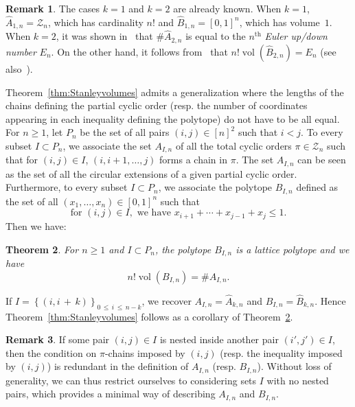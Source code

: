 \documentclass[11pt]{article}
\newtheorem{theo}{Theorem}[section]
\theoremstyle{definition}
\newtheorem{rema}[theo]{Remark}
\numberwithin{equation}{section}
\numberwithin{figure}{section}
\numberwithin{table}{section}
\DeclareMathOperator{\vol}{vol}
\newcommand{\calZ}{\mathcal Z}
\newcommand*{\MK}{\mkern 2mu}
\begin{document}
\begin{rema}\label{rem:k23}
The cases $k=1$ and $k=2$ are already known. When $k=1$, $\hat{A}_{1,n}=\calZ_n$, which has cardinality $n!$ and $\hat{B}_{1,n}=[0,1]^n$, which has volume~$1$. When $k=2$, it was shown in~\cite{R17} that $\# \hat{A}_{2,n}$ is equal to the $n^\text{th}$ \emph{Euler up/down number} $E_n$. On the other hand, it follows from~\cite[Exercise~4.56$\MK$(c)]{S12} that $n! \vol(\hat{B}_{2,n}) = E_n$ (see also~\cite{SMN79}).
\end{rema}
Theorem~\ref{thm:Stanleyvolumes} admits a generalization where the lengths of the chains defining the partial cyclic order (resp. the number of coordinates appearing in each inequality defining the polytope) do not have to be all equal. For $n\geq1$, let $P_n$ be the set of all pairs $(i,j)\in [n]^2$ such that $i<j$. To every subset $I\subset P_n$, we associate the set $A_{I,n}$ of all the total cyclic orders $\pi \in\calZ_n$ such that for $(i,j)\in I$, $(i,i+1,\ldots,j)$ forms a chain in $\pi$. The set $A_{I,n}$ can be seen as the set of all the circular extensions of a given partial cyclic order. Furthermore, to every subset $I\subset P_n$, we associate the polytope $B_{I,n}$ defined as the set of all $(x_1,\ldots,x_{n})\in[0,1]^{n}$ such that
\[
\text{for } (i,j)\in I, \text{ we have } x_{i+1} + \cdots + x_{j-1} + x_j\leq 1.
\]
Then we have:

\begin{theo}\label{thm:consecutivesums}
For $n\geq1$ and $I\subset P_{n}$, the polytope $B_{I,n}$ is a lattice polytope and we have
\begin{equation}
n! \vol(B_{I,n}) = \# A_{I,n}.
\end{equation}
\end{theo}

If $I=\left\{(i,i\,+\,k)\right\}_{0\,\leq\,i\,\leq\,n-k}$, we recover $A_{I,n}=\hat{A}_{k,n}$ and $B_{I,n}=\hat{B}_{k,n}$. Hence Theorem~\ref{thm:Stanleyvolumes} follows as a corollary of Theorem~\ref{thm:consecutivesums}.

\begin{rema}
If some pair $(i,j)\in I$ is nested inside another pair $(i',j')\in I$, then the condition on $\pi$-chains imposed by $(i,j)$ (resp. the inequality imposed by $(i,j)$) is redundant in the definition of $A_{I,n}$ (resp. $B_{I,n}$). Without loss of generality, we can thus restrict ourselves to considering sets $I$ with no nested pairs, which provides a minimal way of describing $A_{I,n}$ and $B_{I,n}$.
\end{rema}
\end{document}
